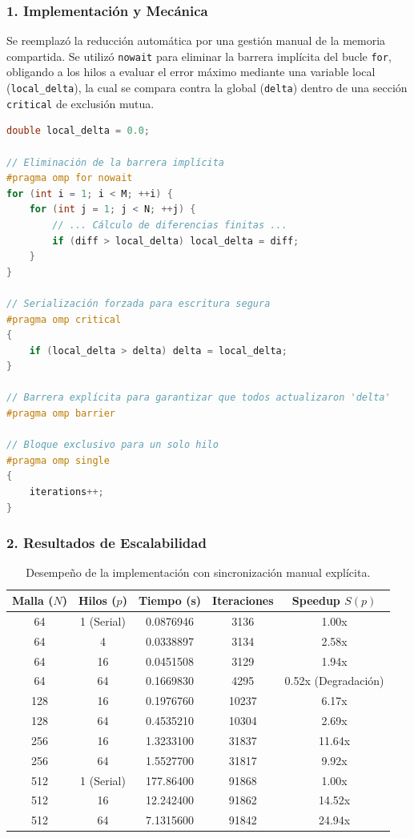 \documentclass[11pt,a4paper]{article}
\begin{document}
\subsubsection*{1. Implementación y Mecánica}
Se reemplazó la reducción automática por una gestión manual de la memoria compartida. Se utilizó \texttt{nowait} para eliminar la barrera implícita del bucle \texttt{for}, obligando a los hilos a evaluar el error máximo mediante una variable local (\texttt{local\_delta}), la cual se compara contra la global (\texttt{delta}) dentro de una sección \texttt{critical} de exclusión mutua.

\begin{lstlisting}[language=C++, caption={Gestión manual de sincronización y reducción del error.}, label={lst:act5}]
double local_delta = 0.0;

// Eliminación de la barrera implícita
#pragma omp for nowait
for (int i = 1; i < M; ++i) {
    for (int j = 1; j < N; ++j) {
        // ... Cálculo de diferencias finitas ...
        if (diff > local_delta) local_delta = diff;
    }
}

// Serialización forzada para escritura segura
#pragma omp critical
{
    if (local_delta > delta) delta = local_delta;
}

// Barrera explícita para garantizar que todos actualizaron 'delta'
#pragma omp barrier

// Bloque exclusivo para un solo hilo
#pragma omp single
{
    iterations++;
}
\end{lstlisting}

\subsubsection*{2. Resultados de Escalabilidad}
\begin{table}[H]
\centering
\renewcommand{\arraystretch}{1.2}
\small
\begin{tabular}{|c|c|c|c|c|}
\hline
\textbf{Malla ($N$)} & \textbf{Hilos ($p$)} & \textbf{Tiempo (s)} & \textbf{Iteraciones} & \textbf{Speedup $S(p)$} \\ \hline
64 & 1 (Serial) & 0.0876946 & 3136 & 1.00x \\ 
64 & 4 & 0.0338897 & 3134 & 2.58x \\
64 & 16 & 0.0451508 & 3129 & 1.94x \\ 
64 & 64 & 0.1669830 & 4295 & 0.52x (Degradación) \\ \hline
128 & 16 & 0.1976760 & 10237 & 6.17x \\ 
128 & 64 & 0.4535210 & 10304 & 2.69x \\ \hline
256 & 16 & 1.3233100 & 31837 & 11.64x \\ 
256 & 64 & 1.5527700 & 31817 & 9.92x \\ \hline
512 & 1 (Serial) & 177.86400 & 91868 & 1.00x \\ 
512 & 16 & 12.242400 & 91862 & 14.52x \\ 
512 & 64 & 7.1315600 & 91842 & 24.94x \\ \hline
\end{tabular}
\caption{Desempeño de la implementación con sincronización manual explícita.}
\label{tab:resultados_sync}
\end{table}
\end{document}
